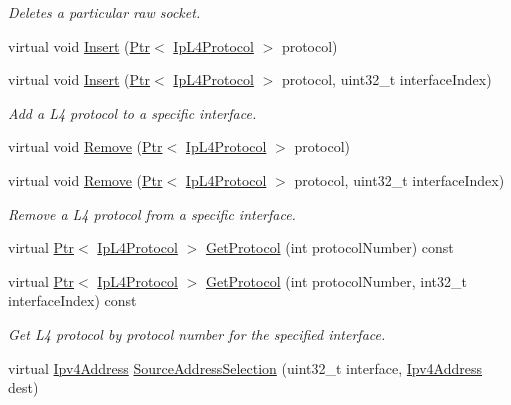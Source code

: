 \begin{DoxyCompactItemize}
\begin{DoxyCompactList}\small\item\em Deletes a particular raw socket. \end{DoxyCompactList}\item 
virtual void \hyperlink{classns3_1_1Ipv4L3Protocol_adcca82f024e576d06b4687ec3519ed8b}{Insert} (\hyperlink{classns3_1_1Ptr}{Ptr}$<$ \hyperlink{classns3_1_1IpL4Protocol}{Ip\+L4\+Protocol} $>$ protocol)
\item 
virtual void \hyperlink{classns3_1_1Ipv4L3Protocol_a2c8c7ce0f9c6e8ca5825d9abc5554f1c}{Insert} (\hyperlink{classns3_1_1Ptr}{Ptr}$<$ \hyperlink{classns3_1_1IpL4Protocol}{Ip\+L4\+Protocol} $>$ protocol, uint32\+\_\+t interface\+Index)
\begin{DoxyCompactList}\small\item\em Add a L4 protocol to a specific interface. \end{DoxyCompactList}\item 
virtual void \hyperlink{classns3_1_1Ipv4L3Protocol_a718acab47b00b50f77c9acb05efbf220}{Remove} (\hyperlink{classns3_1_1Ptr}{Ptr}$<$ \hyperlink{classns3_1_1IpL4Protocol}{Ip\+L4\+Protocol} $>$ protocol)
\item 
virtual void \hyperlink{classns3_1_1Ipv4L3Protocol_abb4d0e17bda74dd318b3ff2cb3db58ee}{Remove} (\hyperlink{classns3_1_1Ptr}{Ptr}$<$ \hyperlink{classns3_1_1IpL4Protocol}{Ip\+L4\+Protocol} $>$ protocol, uint32\+\_\+t interface\+Index)
\begin{DoxyCompactList}\small\item\em Remove a L4 protocol from a specific interface. \end{DoxyCompactList}\item 
virtual \hyperlink{classns3_1_1Ptr}{Ptr}$<$ \hyperlink{classns3_1_1IpL4Protocol}{Ip\+L4\+Protocol} $>$ \hyperlink{classns3_1_1Ipv4L3Protocol_acbe71267a0b2bca4569cf574148d3361}{Get\+Protocol} (int protocol\+Number) const 
\item 
virtual \hyperlink{classns3_1_1Ptr}{Ptr}$<$ \hyperlink{classns3_1_1IpL4Protocol}{Ip\+L4\+Protocol} $>$ \hyperlink{classns3_1_1Ipv4L3Protocol_a4c12ae9366588d171aac8cebb74931dc}{Get\+Protocol} (int protocol\+Number, int32\+\_\+t interface\+Index) const 
\begin{DoxyCompactList}\small\item\em Get L4 protocol by protocol number for the specified interface. \end{DoxyCompactList}\item 
virtual \hyperlink{classns3_1_1Ipv4Address}{Ipv4\+Address} \hyperlink{classns3_1_1Ipv4L3Protocol_a60f11e28019741497dd8730f53294b4f}{Source\+Address\+Selection} (uint32\+\_\+t interface, \hyperlink{classns3_1_1Ipv4Address}{Ipv4\+Address} dest)

\end{DoxyCompactItemize}
